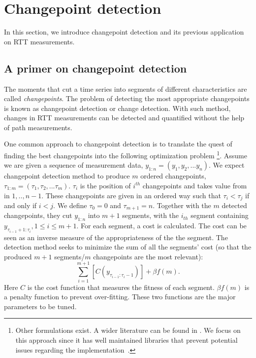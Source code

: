 \section{Changepoint detection}
\label{sec:cpt}
In this section, we introduce changepoint detection and its previous application on RTT measurements.

\subsection{A primer on changepoint detection}
The moments that cut a time series into segments of different characteristics are called \textit{changepoints}.
The problem of detecting the most appropriate changepoints is known as changepoint detection or change detection.
With such method, changes in RTT measurements can be detected and quantified without the help of path measurements.

One common approach to changepoint detection is to translate the quest of finding the best changepoints into the following optimization problem \footnote{Other formulations exist. A wider literature can be found in \cite{Haynes2016, Eckley2011}. We focus on this approach since it has well maintained libraries that prevent potential issues regarding the implementation~\cite{Killick2013a, Haynes2016}.}.
Assume we are given a sequence of measurement data, $y_{1:n} = (y_1, y_2,...y_n)$.
We expect changepoint detection method to produce $m$ ordered changepoints, $\tau_{1:m} = (\tau_1, \tau_2,...\tau_m)$.
$\tau_i$ is the position of $i^{th}$ changepoints and takes value from in ${1,..,n-1}$.
These changepoints are given in an ordered way such that $\tau_i < \tau_j$ if and only if $i < j$.
We define $\tau_0 = 0$ and $\tau_{m+1} = n$.
Together with the $m$ detected changepoints, they cut $y_{1:n}$ into $m+1$ segments, with the $i_{th}$ segment containing $y_{\tau_{i-1}+1:\tau_i}, 1 \leq i \leq m+1 $.
For each segment, a cost is calculated. 
The cost can be seen as an inverse measure of the appropriateness of the the segment.
The detection method seeks to minimize the sum of all the segments' cost (so that the produced $m+1$ segments/$m$ changepoints are the most relevant): 
\begin{equation*}
\sum_{i=1}^{m+1}[C(y_{\tau_{i-1}:\tau_i-1})] + \beta f(m).
\end{equation*}
Here $C$ is the cost function that measures the fitness of each segment.
$\beta f(m)$ is a penalty function to prevent over-fitting.
These two functions are the major parameters to be tuned.

